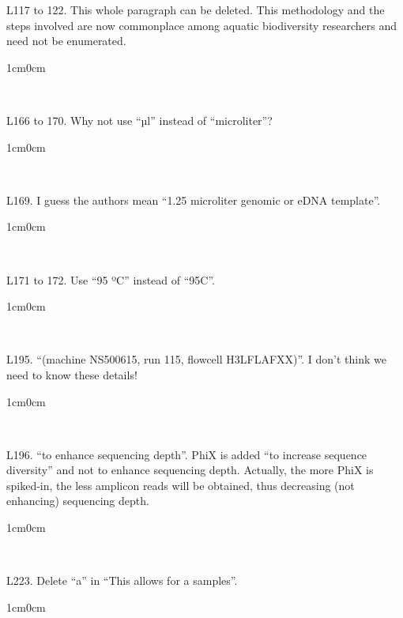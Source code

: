 \documentclass{article}
\newenvironment{response}
	{
	\begin{adjustwidth}{1cm}{0cm}
	\itshape %
	}
	{
	\end{adjustwidth}
	}
\begin{document}
L117 to 122. This whole paragraph can be deleted. This methodology and the steps involved are now commonplace among aquatic biodiversity researchers and need not be enumerated.
\begin{response}
  \\
\end{response}

L166 to 170. Why not use “µl” instead of “microliter”?
\begin{response}
  \\
\end{response}

L169. I guess the authors mean “1.25 microliter genomic or eDNA template”.
\begin{response}
  \\
\end{response}

L171 to 172. Use “95 ºC” instead of “95C”.
\begin{response}
  \\
\end{response}

L195. “(machine NS500615, run 115, flowcell H3LFLAFXX)”. I don't think we need to know these details!
\begin{response}
  \\
\end{response}

L196. “to enhance sequencing depth”. PhiX is added “to increase sequence diversity” and not to enhance sequencing depth. Actually, the more PhiX is spiked-in, the less amplicon reads will be obtained, thus decreasing (not enhancing) sequencing depth.
\begin{response}
  \\
\end{response}

L223. Delete “a” in “This allows for a samples”.
\begin{response}
  \\
\end{response}
\end{document}
